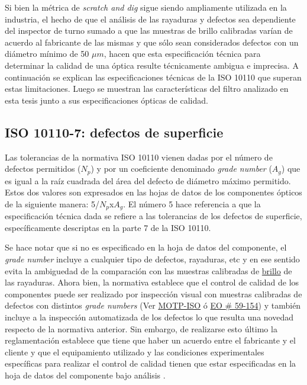 Si bien la métrica de \textit{scratch and dig} sigue siendo ampliamente utilizada en la industria, el hecho de que el análisis de las rayaduras y defectos sea dependiente del inspector de turno sumado a que las muestras de brillo calibradas varían de acuerdo al fabricante de las mismas y que sólo sean considerados defectos con un diámetro mínimo de 50 $\mu m$, hacen que esta especificación técnica para determinar la calidad de una óptica resulte técnicamente ambigua e imprecisa.  A continuación se explican las especificaciones técnicas de la ISO 10110 que superan estas limitaciones. Luego se muestran las características del filtro analizado en esta tesis junto a sus especificaciones ópticas de calidad.

\singlespacing
\subsection{ISO 10110-7: defectos de superficie}
\label{sec:iso10110}


\hspace{0.5cm}Las tolerancias de la normativa ISO 10110 vienen dadas por el número de defectos permitidos ($N_{p}$) y por un coeficiente denominado \textit{grade number} ($A_{g}$) que es igual a la raíz cuadrada del área del defecto de diámetro máximo permitido. Estos dos valores son expresados en las hojas de datos de los componentes ópticos de la siguiente manera: 5/$N_{p}$x$A_{g}$. El número 5 hace referencia a que la especificación técnica dada se refiere a las tolerancias de los defectos de superficie, específicamente descriptas en la parte 7 de la ISO 10110. 

Se hace notar que si no es especificado en la hoja de datos del componente, el \textit{grade number} incluye a cualquier tipo de defectos, rayaduras, etc y en ese sentido evita la ambiguedad de la comparación con las muestras calibradas de \underline{brillo} de las rayaduras. Ahora bien, la normativa establece que el control de calidad de los componentes puede ser realizado por inspección visual con muestras calibradas de defectos con distintos \textit{grade numbers} (Ver \href{https://www.thorlabs.com/thorproduct.cfm?partnumber=MOTP-ISO}{MOTP-ISO} ó \href{https://www.edmundoptics.com/p/scratch-amp-dig-target-1st-surface-positive/15899/}{EO \# 59-154}) y también incluye a la inspección automatizada de los defectos lo que resulta una novedad respecto de la normativa anterior. Sin embargo, de realizarse esto último la reglamentación establece que tiene que haber un acuerdo entre el fabricante y el cliente y que el equipamiento utilizado y las condiciones experimentales específicas para realizar el control de calidad tienen que estar especificadas en la hoja de datos del componente bajo análisis \cite{acuerdocon}.

